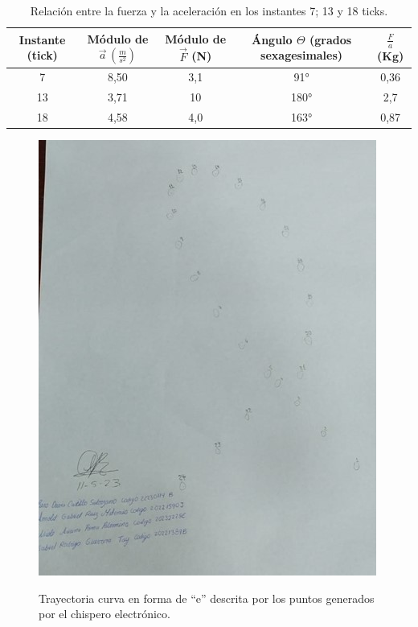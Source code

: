 \documentclass[../main.tex]{subfiles}
\begin{document}
\begin{table}[H]
    \centering
    \begin{tabular}{c|c|c|c|c}
        \hline
        Instante (tick)	& 
        Módulo de $\vec{a}\,(\frac{m}{s^2})$ &	
        Módulo de $\vec{F}$ (N) &	
        Ángulo $\Theta$ (grados sexagesimales)	&
        $\frac{F}{a}$ (Kg)\\
        \hline
        7	& 8,50	& 3,1	& 91°	    & 0,36\\
        13	& 3,71	& 10	& 180°	& 2,7\\
        18	& 4,58	& 4,0	& 163°	& 0,87\\
        \hline
    \end{tabular}
    \label{ref:tab9}
    \caption{Relación entre la fuerza y la aceleración en los instantes 7; 13 y 18 ticks.}
\end{table}

\begin{figure}[H]
    \centering
    \includegraphics[width=0.8\linewidth]{images/calc7.jpg}
    \label{ref:calc7}
    \caption{Trayectoria curva en forma de “e” descrita por los puntos generados por el chispero electrónico.}
\end{figure}
\end{document}
